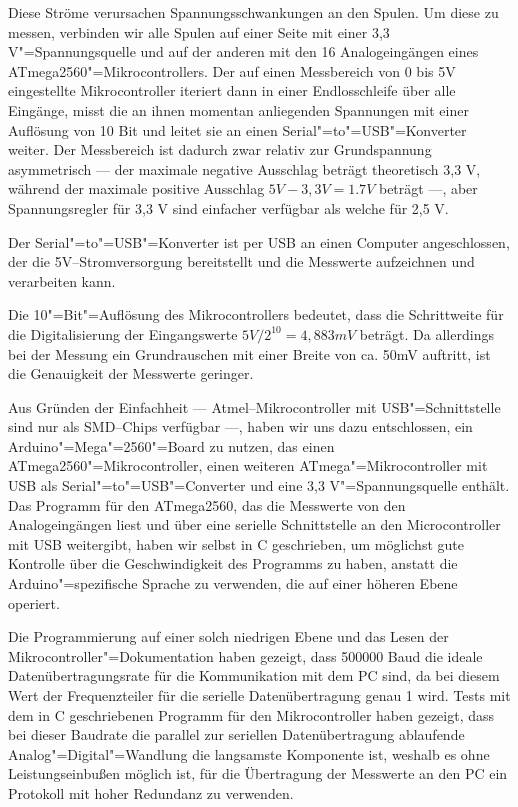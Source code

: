 Diese Ströme verursachen Spannungsschwankungen an den Spulen. Um diese zu messen,
verbinden wir alle Spulen auf einer Seite mit einer 3,3 V"=Spannungsquelle und auf der
anderen mit den 16 Analogeingängen eines ATmega2560"=Mikrocontrollers. Der auf einen
Messbereich von 0 bis 5V eingestellte Mikrocontroller iteriert dann in einer Endlosschleife
über alle Eingänge, misst die an ihnen momentan anliegenden Spannungen mit einer
Auflösung von 10 Bit und leitet sie an einen Serial"=to"=USB"=Konverter weiter. Der Messbereich
ist dadurch zwar relativ zur Grundspannung asymmetrisch --- der maximale negative Ausschlag beträgt
theoretisch 3,3 V, während der maximale positive Ausschlag $ 5V - 3,3 V = 1.7 V $ beträgt ---, aber
Spannungsregler für 3,3 V sind einfacher verfügbar als welche für 2,5 V.

Der Serial"=to"=USB"=Konverter ist per USB an einen Computer angeschlossen, der die 5V--Stromversorgung
bereitstellt und die Messwerte aufzeichnen und verarbeiten kann.

Die 10"=Bit"=Auflösung des Mikrocontrollers bedeutet, dass die Schrittweite für die Digitalisierung
der Eingangswerte $ 5 V / 2^{10} = 4,883 mV $ beträgt. Da allerdings bei der Messung ein
Grundrauschen mit einer Breite von ca. 50mV auftritt, ist die Genauigkeit der Messwerte geringer.

Aus Gründen der Einfachheit --- Atmel--Mikrocontroller mit USB"=Schnittstelle sind nur als SMD--Chips
verfügbar ---, haben wir uns dazu entschlossen, ein Arduino"=Mega"=2560"=Board zu nutzen, das einen
ATmega2560"=Mikrocontroller, einen weiteren ATmega"=Mikrocontroller mit USB als Serial"=to"=USB"=Converter und eine 
3,3 V"=Spannungsquelle enthält. Das Programm für den ATmega2560, das die Messwerte von den
Analogeingängen liest und über eine serielle Schnittstelle an den Microcontroller mit USB weitergibt, haben
wir selbst in C geschrieben, um möglichst gute Kontrolle über die Geschwindigkeit des Programms
zu haben, anstatt die Arduino"=spezifische Sprache zu verwenden, die auf
einer höheren Ebene operiert.

Die Programmierung auf einer solch niedrigen Ebene und das Lesen der Mikrocontroller"=Dokumentation
haben gezeigt, dass 500000 Baud die ideale Datenübertragungsrate für die Kommunikation mit dem PC
sind, da bei diesem Wert der Frequenzteiler für die serielle Datenübertragung genau 1 wird.
Tests mit dem in C geschriebenen Programm für den Mikrocontroller haben gezeigt, dass bei
dieser Baudrate die
parallel zur seriellen Datenübertragung ablaufende Analog"=Digital"=Wandlung die langsamste
Komponente ist, weshalb es ohne Leistungseinbußen möglich ist, für die Übertragung
der Messwerte an den PC ein Protokoll mit hoher Redundanz zu verwenden.

